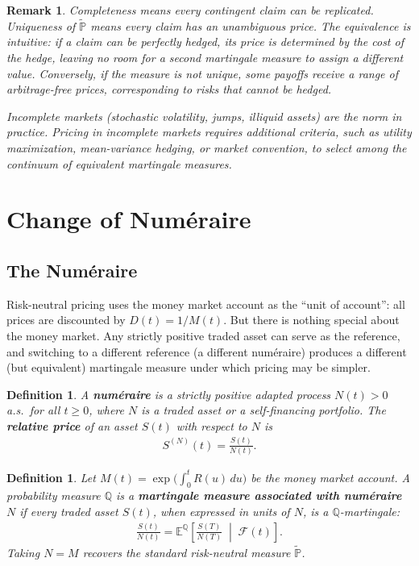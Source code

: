 \documentclass{report}
\theoremstyle{spacedplain}
\theoremstyle{spaceddefinition}
\newtheorem{definition}[theorem]{Definition}
\theoremstyle{spacedremark}
\newtheorem{remark}[theorem]{Remark}
\begin{document}
\begin{remark}
Completeness means every contingent claim can be replicated. Uniqueness of $\widetilde{\mathbb{P}}$ means every claim has an unambiguous price. The equivalence is intuitive: if a claim can be perfectly hedged, its price is determined by the cost of the hedge, leaving no room for a second martingale measure to assign a different value. Conversely, if the measure is not unique, some payoffs receive a range of arbitrage-free prices, corresponding to risks that cannot be hedged.

Incomplete markets (stochastic volatility, jumps, illiquid assets) are the norm in practice. Pricing in incomplete markets requires additional criteria, such as utility maximization, mean-variance hedging, or market convention, to select among the continuum of equivalent martingale measures.
\end{remark}

\section{Change of Num\'eraire}

\subsection{The Num\'eraire}

Risk-neutral pricing uses the money market account as the ``unit of account'': all prices are discounted by $D(t) = 1/M(t)$. But there is nothing special about the money market. Any strictly positive traded asset can serve as the reference, and switching to a different reference (a different num\'eraire) produces a different (but equivalent) martingale measure under which pricing may be simpler.

\begin{definition}
A \textbf{num\'eraire} is a strictly positive adapted process $N(t) > 0$ a.s.\ for all $t \geq 0$, where $N$ is a traded asset or a self-financing portfolio. The \textbf{relative price} of an asset $S(t)$ with respect to $N$ is
\begin{align}
    S^{(N)}(t) = \frac{S(t)}{N(t)}.
\end{align}
\end{definition}

\begin{definition}
Let $M(t) = \exp\bigl(\int_0^t R(u)\,du\bigr)$ be the money market account. A probability measure $\mathbb{Q}$ is a \textbf{martingale measure associated with num\'eraire $N$} if every traded asset $S(t)$, when expressed in units of $N$, is a $\mathbb{Q}$-martingale:
\begin{align}
    \frac{S(t)}{N(t)} = \mathbb{E}^{\mathbb{Q}}\!\left[\frac{S(T)}{N(T)}\;\middle|\;\mathcal{F}(t)\right].
\end{align}
Taking $N = M$ recovers the standard risk-neutral measure $\widetilde{\mathbb{P}}$.
\end{definition}
\end{document}
